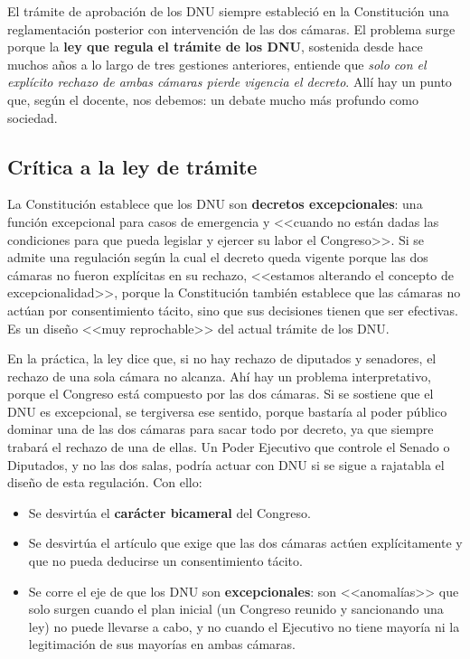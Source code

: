 \documentclass[12pt,oneside]{book}
\begin{document}
El trámite de aprobación de los DNU siempre estableció en la Constitución una reglamentación posterior con intervención de las dos cámaras. El problema surge porque la \textbf{ley que regula el trámite de los DNU}, sostenida desde hace muchos años a lo largo de tres gestiones anteriores, entiende que \textit{solo con el explícito rechazo de ambas cámaras pierde vigencia el decreto}. Allí hay un punto que, según el docente, nos debemos: un debate mucho más profundo como sociedad.

\subsection{Crítica a la ley de trámite}

La Constitución establece que los DNU son \textbf{decretos excepcionales}: una función excepcional para casos de emergencia y <<cuando no están dadas las condiciones para que pueda legislar y ejercer su labor el Congreso>>. Si se admite una regulación según la cual el decreto queda vigente porque las dos cámaras no fueron explícitas en su rechazo, <<estamos alterando el concepto de excepcionalidad>>, porque la Constitución también establece que las cámaras no actúan por consentimiento tácito, sino que sus decisiones tienen que ser efectivas. Es un diseño <<muy reprochable>> del actual trámite de los DNU.

En la práctica, la ley dice que, si no hay rechazo de diputados y senadores, el rechazo de una sola cámara no alcanza. Ahí hay un problema interpretativo, porque el Congreso está compuesto por las dos cámaras. Si se sostiene que el DNU es excepcional, se tergiversa ese sentido, porque bastaría al poder público dominar una de las dos cámaras para sacar todo por decreto, ya que siempre trabará el rechazo de una de ellas. Un Poder Ejecutivo que controle el Senado o Diputados, y no las dos salas, podría actuar con DNU si se sigue a rajatabla el diseño de esta regulación. Con ello:

\begin{itemize}
    \item Se desvirtúa el \textbf{carácter bicameral} del Congreso.
    \item Se desvirtúa el artículo que exige que las dos cámaras actúen explícitamente y que no pueda deducirse un consentimiento tácito.
    \item Se corre el eje de que los DNU son \textbf{excepcionales}: son <<anomalías>> que solo surgen cuando el plan inicial (un Congreso reunido y sancionando una ley) no puede llevarse a cabo, y no cuando el Ejecutivo no tiene mayoría ni la legitimación de sus mayorías en ambas cámaras.
\end{itemize}
\end{document}
